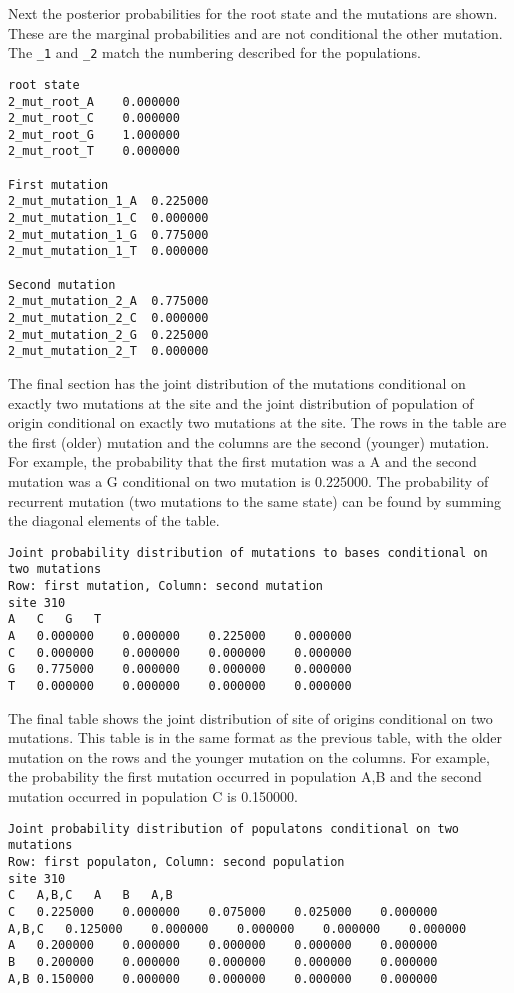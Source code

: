 \documentclass[11pt]{article}
\begin{document}
Next the posterior probabilities for the root state and the mutations are shown.
These are the marginal probabilities and are not conditional the other mutation. 
The \texttt{\_1} and \texttt{\_2} match the numbering described for the populations.
\begin{Verbatim}[frame=single, fontsize=\small]
root state
2_mut_root_A	0.000000	
2_mut_root_C	0.000000	
2_mut_root_G	1.000000	
2_mut_root_T	0.000000	

First mutation
2_mut_mutation_1_A	0.225000	
2_mut_mutation_1_C	0.000000	
2_mut_mutation_1_G	0.775000	
2_mut_mutation_1_T	0.000000	

Second mutation
2_mut_mutation_2_A	0.775000	
2_mut_mutation_2_C	0.000000	
2_mut_mutation_2_G	0.225000	
2_mut_mutation_2_T	0.000000
\end{Verbatim}

The final section has the joint distribution of the mutations conditional on exactly two mutations at the site and the joint distribution of population of origin conditional on exactly two mutations at the site.
The rows in the table are the first (older) mutation and the columns are the second (younger) mutation.
For example, the probability that the first mutation was a A and the second mutation was a G conditional on two mutation is 0.225000. 
The probability of recurrent mutation (two mutations to the same state) can be found by summing the diagonal elements of the table.
\begin{Verbatim}[frame=single, fontsize=\small]
Joint probability distribution of mutations to bases conditional on two mutations
Row: first mutation, Column: second mutation
site 310
A	C	G	T
A	0.000000	0.000000	0.225000	0.000000	
C	0.000000	0.000000	0.000000	0.000000	
G	0.775000	0.000000	0.000000	0.000000	
T	0.000000	0.000000	0.000000	0.000000
\end{Verbatim}

The final table shows the joint distribution of site of origins conditional on two mutations.
This table is in the same format as the previous table, with the older mutation on the rows and the younger mutation on the columns. 
For example, the probability the first mutation occurred in population A,B and the second mutation occurred in population C is 0.150000. 
\begin{Verbatim}[frame=single, fontsize=\small]
Joint probability distribution of populatons conditional on two mutations
Row: first populaton, Column: second population
site 310
C	A,B,C	A	B	A,B
C	0.225000	0.000000	0.075000	0.025000	0.000000	
A,B,C	0.125000	0.000000	0.000000	0.000000	0.000000	
A	0.200000	0.000000	0.000000	0.000000	0.000000	
B	0.200000	0.000000	0.000000	0.000000	0.000000	
A,B	0.150000	0.000000	0.000000	0.000000	0.000000
\end{Verbatim}
\end{document}
